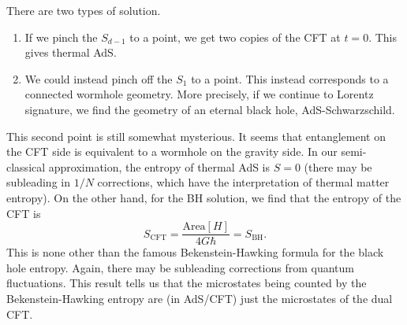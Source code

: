 There are two types of solution.
\begin{enumerate}
    \item If we pinch the $S_{d-1}$ to a point, we get two copies of the CFT at $t=0$. This gives thermal AdS.
    \item We could instead pinch off the $S_1$ to a point. This instead corresponds to a connected wormhole geometry. More precisely, if we continue to Lorentz signature, we find the geometry of an eternal black hole, AdS-Schwarzschild.
\end{enumerate}
This second point is still somewhat mysterious. It seems that entanglement on the CFT side is equivalent to a wormhole on the gravity side. In our semi-classical approximation, the entropy of thermal AdS is $S=0$ (there may be subleading in $1/N$ corrections, which have the interpretation of thermal matter entropy). On the other hand, for the BH solution, we find that the entropy of the CFT is
\begin{equation}
    S_\text{CFT}=\frac{\text{Area}[H]}{4G\hbar} = S_\text{BH}.
\end{equation}
This is none other than the famous Bekenstein-Hawking formula for the black hole entropy. Again, there may be subleading corrections from quantum fluctuations.
This result tells us that the microstates being counted by the Bekenstein-Hawking entropy are (in AdS/CFT) just the microstates of the dual CFT.